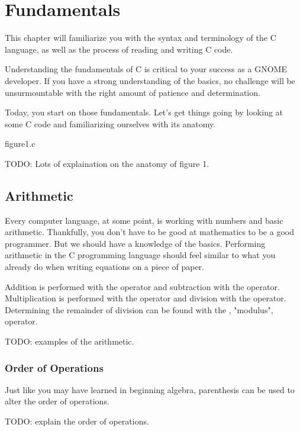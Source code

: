\chapter{Fundamentals}

This chapter will familiarize you with the syntax and terminology of the C
language, as well as the process of reading and writing C code.

Understanding the fundamentals of C is critical to your success as a GNOME
developer. If you have a strong understanding of the basics, no challenge will 
be unsurmountable with the right amount of patience and determination.

Today, you start on those fundamentals. Let's get things going by looking at
some C code and familiarizing ourselves with its anatomy.


\begin{code}{figure1.c}

\end{code}


TODO: Lots of explaination on the anatomy of figure 1.


\section{Arithmetic}

Every computer language, at some point, is working with numbers and basic
arithmetic. Thankfully, you don't have to be good at mathematics to be a good
programmer. But we should have a knowledge of the basics. Performing arithmetic
in the C programming language should feel similar to what you already do when
writing equations on a piece of paper.

Addition is performed with the \ident{+} operator and subtraction with the
\ident{-} operator. Multiplication is performed with the \ident{*} operator and
division with the \ident{/} operator. Determining the remainder of division can
be found with the \ident{\%}, "modulus", operator.

TODO: examples of the arithmetic.

\subsection{Order of Operations}

Just like you may have learned in beginning algebra, parenthesis can be used
to alter the order of operations.

TODO: explain the order of operations.

